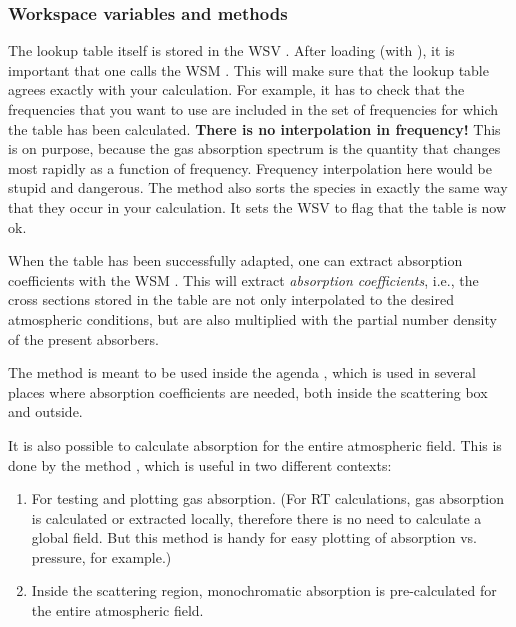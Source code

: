 \subsubsection{Workspace variables and methods}

The lookup table itself is stored in the WSV
. After loading (with ),
it is important that one calls the WSM
. This will make sure that the lookup
table agrees exactly with your calculation. For example, it has to
check that the frequencies that you want to use are included in the
set of frequencies for which the table has been calculated.
\textbf{There is no interpolation in frequency!} This is on purpose,
because the gas absorption spectrum is the quantity that changes most
rapidly as a function of frequency. Frequency interpolation here would
be stupid and dangerous. The method also sorts the species in exactly
the same way that they occur in your calculation. It sets the WSV
 to flag that the table is now
ok.

When the table has been successfully adapted, one can extract
absorption coefficients with the WSM
. This will extract
\emph{absorption coefficients}, i.e., the cross sections stored in the
table are not only interpolated to the desired atmospheric conditions,
but are also multiplied with the partial number density of the present
absorbers. 

The  method is meant to
be used inside the agenda ,
which is used in several places where absorption coefficients are
needed, both inside the scattering box and outside. 

It is also possible to calculate absorption for the entire atmospheric
field.  This is done by the method
, which is useful in two
different contexts:

\begin{enumerate}
\item For testing and plotting gas absorption. (For RT
  calculations, gas absorption is calculated or extracted locally,
  therefore there is no need to calculate a global field. But this
  method is handy for easy plotting of absorption vs. pressure, for
  example.)
\item Inside the scattering region, monochromatic absorption is
  pre-calculated for the entire atmospheric field.
\end{enumerate}

